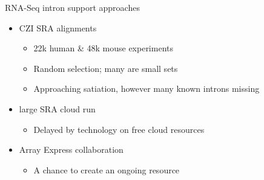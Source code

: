 \documentclass[10pt,
               hyperref={bookmarks=false,
                         bookmarksopen=false,
                         colorlinks=true,
                         linkcolor=blue,
                         urlcolor=blue},
               xcolor={svgnames,table}]{beamer}
\newenvironment{tightitemize}{%
\begin{itemize}
  \setlength{\itemsep}{1pt}%
  \setlength{\parskip}{0pt}%
  \setlength{\parsep}{0pt}%
}{\end{itemize}}
\begin{document}
\begin{frame}{RNA-Seq intron support approaches}
  \begin{itemize}
  \item CZI SRA alignments
    \begin{tightitemize}
    \item 22k human \& 48k mouse experiments
    \item Random selection; many are small sets
    \item Approaching satiation, however many known introns missing
    \end{tightitemize}
  \item large SRA cloud run
    \begin{tightitemize}
    \item Delayed by technology on free cloud resources
    \end{tightitemize}
  \item Array Express collaboration
    \begin{tightitemize}
    \item A chance to create an ongoing resource
    \end{tightitemize}
  \end{itemize}
\end{frame}
\end{document}
